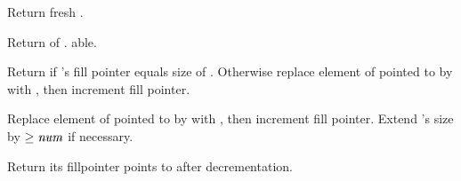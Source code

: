 \begin{LIST}{1cm}
  
  Return fresh .

  Return  of . able.

  Return \retval{\NIL} if 's fill pointer equals size of
  . Otherwise replace element of  pointed to
  by  with , then increment fill
  pointer. 

  Replace element of  pointed to by  with
  , then increment fill pointer. Extend 's size by
  $\ge \VAR{num}$ if necessary.

  Return  its fillpointer points to
  after decrementation.

\end{LIST}



